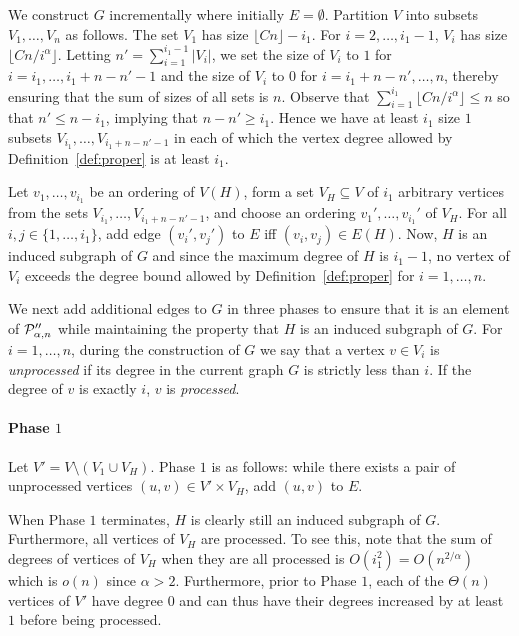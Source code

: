 We construct $G$ incrementally where initially $E = \emptyset$. Partition $V$ into subsets $V_1,\ldots,V_n$ as follows. The set $V_1$ has size $\lfloor Cn\rfloor - i_1$. For $i = 2,\ldots,i_1-1$, $V_i$ has size $\lfloor Cn/i^\alpha\rfloor$. Letting $n' = \sum_{i = 1}^{i_1-1} \vert V_i\vert$, we set the size of $V_i$ to $1$ for $i = i_1,\ldots,i_1+n-n'-1$ and the size of $V_i$ to $0$ for $i = i_1+n-n',\ldots,n$, thereby ensuring that the sum of sizes of all sets is $n$. Observe that $\sum_{i = 1}^{i_1}\lfloor Cn/i^\alpha\rfloor\leq n$ so that $n'\leq n - i_1$, implying that $n-n'\geq i_1$. Hence we have at least $i_1$ size $1$ subsets $V_{i_1},\ldots,V_{i_1+n-n'-1}$ in each of which the vertex degree allowed by Definition~\ref{def:proper} is at least $i_1$.

Let $v_1,\ldots,v_{i_1}$ be an ordering of $V(H)$, form a set $V_H\subseteq V$ of $i_1$ arbitrary vertices from the sets $V_{i_1},\ldots,V_{i_1+n-n'-1}$, and choose an ordering $v_1',\ldots,v_{i_1}'$ of $V_H$. For all $i,j\in\{1,\ldots,i_1\}$, add edge $(v_i',v_j')$ to $E$ iff $(v_i,v_j)\in E(H)$. Now, $H$ is an induced subgraph of $G$ and since the maximum degree of $H$ is $i_1-1$, no vertex of $V_i$ exceeds the degree bound allowed by Definition~\ref{def:proper} for $i = 1,\ldots,n$.

We next add additional edges to $G$ in three phases to ensure that it is an element of $ \mathcal{P}''_{\alpha,n}$ while maintaining the property that $H$ is an induced subgraph of $G$. For $i = 1,\ldots,n$, during the construction of $G$ we say that a vertex $v\in V_i$ is \emph{unprocessed} if its degree in the current graph $G$ is strictly less than $i$. If the degree of $v$ is exactly $i$, $v$ is \emph{processed}.

\paragraph{Phase $1$}
Let $V' = V\setminus (V_1\cup V_H)$. Phase $1$ is as follows: while there exists a pair of unprocessed vertices $(u,v)\in V'\times V_H$, add $(u,v)$ to $E$.

When Phase $1$ terminates, $H$ is clearly still an induced subgraph of $G$. Furthermore, all vertices of $V_H$ are processed. To see this, note that the sum of degrees of vertices of $V_H$ when they are all processed is $O(i_1^2) = O(n^{2/\alpha})$ which is $o(n)$ since $\alpha > 2$. Furthermore, prior to Phase $1$, each of the $\Theta(n)$ vertices of $V'$ have degree $0$ and can thus have their degrees increased by at least $1$ before being processed.

